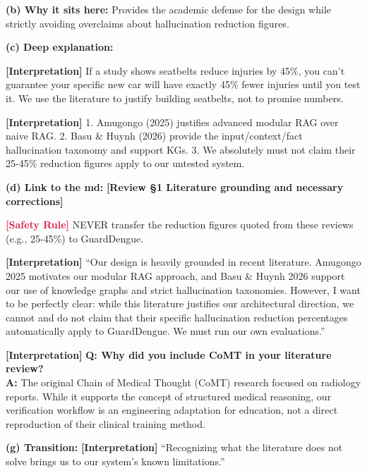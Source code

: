 \documentclass[11pt,a4paper]{article}
\newcommand{\origintag}[2]{\textcolor{#1}{\small\textbf{[#2]}}}
\begin{document}
\textbf{(b) Why it sits here:} Provides the academic defense for the design while strictly avoiding overclaims about hallucination reduction figures.

\textbf{(c) Deep explanation:}
\begin{analogy}
\origintag{slate}{Interpretation} If a study shows seatbelts reduce injuries by 45\%, you can't guarantee your specific new car will have exactly 45\% fewer injuries until you test it. We use the literature to justify building seatbelts, not to promise numbers.
\end{analogy}
\origintag{slate}{Interpretation} 1. Amugongo (2025) justifies advanced modular RAG over naive RAG. 2. Basu \& Huynh (2026) provide the input/context/fact hallucination taxonomy and support KGs. 3. We absolutely must not claim their 25-45\% reduction figures apply to our untested system.

\textbf{(d) Link to the md:} \origintag{amber}{Review \S1 Literature grounding and necessary corrections}

\begin{warning}
\origintag{crimson}{Safety Rule} NEVER transfer the reduction figures quoted from these reviews (e.g., 25-45\%) to GuardDengue.
\end{warning}

\begin{sayit}
\origintag{slate}{Interpretation} ``Our design is heavily grounded in recent literature. Amugongo 2025 motivates our modular RAG approach, and Basu \& Huynh 2026 support our use of knowledge graphs and strict hallucination taxonomies. However, I want to be perfectly clear: while this literature justifies our architectural direction, we cannot and do not claim that their specific hallucination reduction percentages automatically apply to GuardDengue. We must run our own evaluations.''
\end{sayit}

\begin{qa}
\origintag{slate}{Interpretation} \textbf{Q: Why did you include CoMT in your literature review?} \\
\textbf{A:} The original Chain of Medical Thought (CoMT) research focused on radiology reports. While it supports the concept of structured medical reasoning, our verification workflow is an engineering adaptation for education, not a direct reproduction of their clinical training method.
\end{qa}
\textbf{(g) Transition:} \origintag{slate}{Interpretation} ``Recognizing what the literature does not solve brings us to our system's known limitations.''
\end{document}
